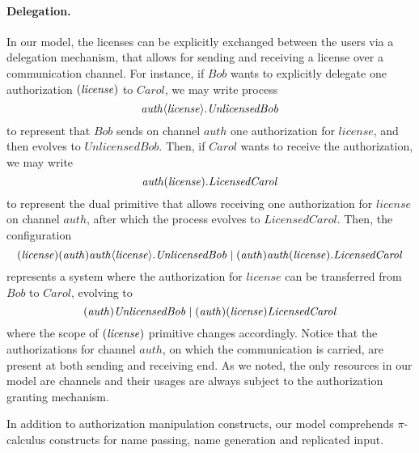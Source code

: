 \paragraph{{Delegation}.} In our model, the licenses can be explicitly exchanged between the users via a delegation mechanism, that allows for sending and receiving a license over a communication channel.   %
For instance, if $\mathit{Bob}$ wants to explicitly delegate one authorization $(\mathit{license})$ to $\mathit{Carol}$, we may write process
\[ 
   {  \mathit{auth}\langle\mathit{license}\rangle.\mathit{UnlicensedBob}}
\]
to represent that $\mathit{Bob}$ sends on channel $\mathit{auth}$ one authorization for $\mathit{license}$, and then evolves to 
$\mathit{UnlicensedBob}$. Then, if $\mathit{Carol}$ wants to receive the authorization, we may write 
\[
   {  \mathit{auth}(\mathit{license}).\mathit{LicensedCarol}}
\]
to 
represent the dual primitive that allows receiving one authorization for
$\mathit{license}$ on channel $\mathit{auth}$, after which the process evolves to $\mathit{LicensedCarol}$. Then, the configuration
%
$$(\mathit{license}) (\mathit{auth})\mathit{auth}\langle\mathit{license}\rangle.\mathit{UnlicensedBob} \;|\; (\mathit{auth})\mathit{auth}(\mathit{license}).\mathit{LicensedCarol}$$
%
represents a system where the authorization for $\mathit{license}$ can
be transferred from $\mathit{Bob}$ to $\mathit{Carol}$, %
evolving to
%
$$ (\mathit{auth})\mathit{UnlicensedBob} \;|\; (\mathit{auth})(\mathit{license})\mathit{LicensedCarol}$$%
%
where the scope of $(\mathit{license})$ primitive changes accordingly. 
Notice that the authorizations for channel $\mathit{auth}$, on which the communication is carried, are present at both sending and receiving end.
As we noted, the only resources in our model are channels and their usages are always subject to the authorization 
granting mechanism. 

In addition to authorization manipulation constructs, our model comprehends $\pi$-calculus constructs for name passing, name generation and replicated input.

